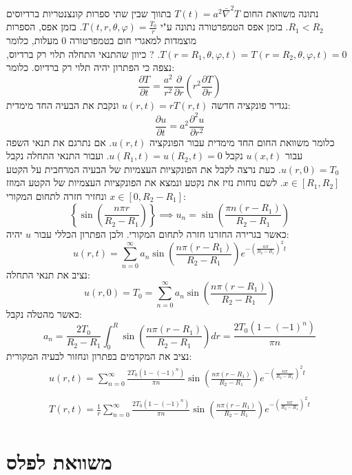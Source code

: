 \documentclass{tstextbook}
\begin{document}
נתונה משוואת החום \(T(t)=a^2\bar{\nabla}^2T\) בתווך שבין שתי ספרות קונצנטריות ברדיוסים \(R_{1}<R_{2}\). בזמן אפס הטמפרטורה נתונה ע"י \(T\left( t,r,\theta,\varphi \right)=\frac{T_{0}}{r}\). בזמן אפס, הספרות מוצמדות למאגרי חום בטמפרטורה 0 מעלות, כלומר \(T\left( r=R_{1},\theta,\varphi,t \right)=T\left( r=R_{2},\theta,\varphi,t \right)=0\).
?
כיוון שהתנאי התחלה תלוי רק ברדיוס, נצפה כי הפתרון יהיה תלוי רק ברדיוס. כלומר:
$${\frac{\partial T}{\partial t}}={\frac{a^{2}}{r^{2}}}{\frac{\partial}{\partial r}}\left(r^{2}{\frac{\partial T}{\partial r}}\right)$$
נגדיר פונקציה חדשה \(u(r,t)=rT(r,t)\) ונקבת את הבעיה החד מימדית:
$$\frac{\partial u}{\partial t} =a^2 \frac{\partial ^2u}{\partial r^2} $$
כלומר משוואת החום החד מימדית עבור הפונקציה \(u(r,t)\). אם נתרגם את תנאי השפה עבור \(u(x,t)\) נקבל \(u(R_{1},t)=u(R_{2},t)=0\). ועבור התנאי התחלה נקבל \(u(r,0)=T_{0}\). כעת נרצה לקבל את הפונקציות העצמיות של הבעיה המרחבית על הקטע \(x \in [R_{1},R_{2}]\). לשם נוחות נזיז את נקטע ונמצא את הפונקציות העצמיות של הקטע המוזז \(x \in [0,R_{2}-R_{1}]\) ונחזיר חזרה לתחום המקורי:
$$\left\{  \sin\left( \frac{n\pi r}{R_{2}-R_{1}} \right)  \right\}\implies u_{n}=\sin \left( \frac{\pi n (r-R_{1})}{R_{2}-R_{1}} \right)$$
כאשר בגרירה החזרנו חזרה לתחום המקורי. ולכן הפתרון הכללי עבור \(u\) יהיה:
$$u(r,t)=\sum_{n=0}^{\infty}a_{n}\sin\left({\frac{n\pi(r-R_{1})}{R_{2}-R_{1}}}\right)e^{-\left({\frac{n\pi}{R_{2}-R_{1}}}\right)^{2}t}$$
נציב את תנאי התחלה:
$$u(r,0)=T_{0}=\sum_{n=0}^{\infty}a_{n}\sin\left({\frac{n\pi(r-R_{1})}{R_{2}-R_{1}}}\right)$$
כאשר מהטלה נקבל:
$$a_{n}={\frac{2T_{0}}{R_{2}-R_{1}}}\int_{0}^{R}\sin\left({\frac{n\pi(r-R_{1})}{R_{2}-R_{1}}}\right)d r={\frac{2T_{0}(1-(-1)^{n})}{\pi n}}$$
נציב את המקדמים בפתרון ונחזור לבעיה המקורית:
$$\begin{array}{c}{{u(r,t)=\displaystyle\sum_{n=0}^{\infty}\frac{2T_{0}(1-(-1)^{n})}{\pi n}\sin\left(\frac{n\pi(r-R_{1})}{R_{2}-R_{1}}\right)e^{-\left(\frac{n\pi}{R_{2}-R_{1}}\right)^{2}t}}}\\ {{{}}}\\ {{T(r,t)=\displaystyle\frac{1}{r}\displaystyle\sum_{n=0}^{\infty}\frac{2T_{0}(1-(-1)^{n})}{\pi n}\sin\left(\frac{n\pi(r-R_{1})}{R_{2}-R_{1}}\right)e^{-\left(\frac{n\pi}{R_{2}-R_{1}}\right)^{2}t}}}\end{array}$$

\section{משוואת לפלס}
\end{document}
